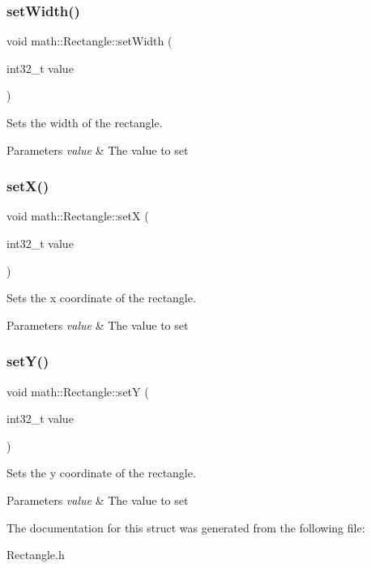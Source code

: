 \subsubsection{\texorpdfstring{setWidth()}{setWidth()}}
{\footnotesize\ttfamily void math\+::\+Rectangle\+::set\+Width (\begin{DoxyParamCaption}\item[{int32\+\_\+t}]{value }\end{DoxyParamCaption})\hspace{0.3cm}{\ttfamily [inline]}}



Sets the width of the rectangle. 


\begin{DoxyParams}{Parameters}
{\em value} & The value to set\\
\hline
\end{DoxyParams}
\mbox{\label{structmath_1_1_rectangle_a01a51ea1a9eabb9cea31893745fcec26}} 
\subsubsection{\texorpdfstring{setX()}{setX()}}
{\footnotesize\ttfamily void math\+::\+Rectangle\+::setX (\begin{DoxyParamCaption}\item[{int32\+\_\+t}]{value }\end{DoxyParamCaption})\hspace{0.3cm}{\ttfamily [inline]}}



Sets the x coordinate of the rectangle. 


\begin{DoxyParams}{Parameters}
{\em value} & The value to set\\
\hline
\end{DoxyParams}
\mbox{\label{structmath_1_1_rectangle_a7d449568e902248b51a45c136cab1e60}} 
\subsubsection{\texorpdfstring{setY()}{setY()}}
{\footnotesize\ttfamily void math\+::\+Rectangle\+::setY (\begin{DoxyParamCaption}\item[{int32\+\_\+t}]{value }\end{DoxyParamCaption})\hspace{0.3cm}{\ttfamily [inline]}}



Sets the y coordinate of the rectangle. 


\begin{DoxyParams}{Parameters}
{\em value} & The value to set\\
\hline
\end{DoxyParams}


The documentation for this struct was generated from the following file\+:\begin{DoxyCompactItemize}
\item 
Rectangle.\+h\end{DoxyCompactItemize}
